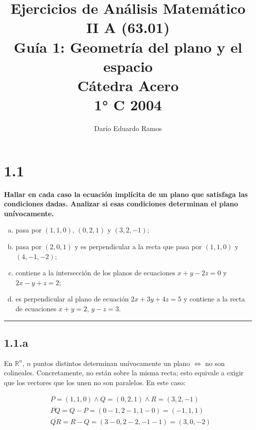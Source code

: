 \documentclass{article}
\title{Ejercicios de Análisis Matemático II A (63.01) \\
Guía 1: Geometría del plano y el espacio \\
Cátedra Acero \\
1° C 2004}
\author{Darío Eduardo Ramos}
\renewcommand{\Bbb}{\mathbb}
\begin{document}
\maketitle

\tableofcontents{}

\newpage

\section*{1.1}
\label{sec:1.1}

\textbf{Hallar en cada caso la ecuación implícita de un plano que satisfaga las condiciones dadas. Analizar si esas condiciones determinan el plano unívocamente.} 

\begin{enumerate}[(a)]
\bfseries
\item pasa por $(1, 1, 0)$, $(0, 2, 1)$ y $(3, 2, -1)$;

\item pasa por $(2, 0, 1)$ y es perpendicular a la recta que pasa por $(1, 1, 0)$ y $(4, -1, -2)$;

\item contiene a la intersección de los planos de ecuaciones $x + y - 2z = 0$ y $2x - y + z = 2$;

\item es perpendicular al plano de ecuación $2x + 3y + 4z = 5$ y contiene a la recta de ecuaciones $x + y = 2$, $y - z = 3$.
\end{enumerate}
\hrule

\subsection*{1.1.a}
\label{subsec:1.1.a}

En $\Bbb R^n$, $n$ puntos distintos determinan unívocamente un plano $\Leftrightarrow$ no son colineales. Concretamente, no están sobre la misma recta; esto equivale a exigir que los vectores que los unen no son paralelos. En este caso:

\begin{subequations}
\begin{align}
& P = (1, 1, 0) \wedge Q = (0, 2, 1) \wedge R = (3, 2, -1) \\
& \overline{PQ} = Q - P = (0-1, 2-1, 1-0) = (-1, 1, 1) \\
& \overline{QR} = R - Q = (3-0, 2-2, -1-1) = (3, 0, -2)
\end{align}
\end{subequations}
\end{document}

